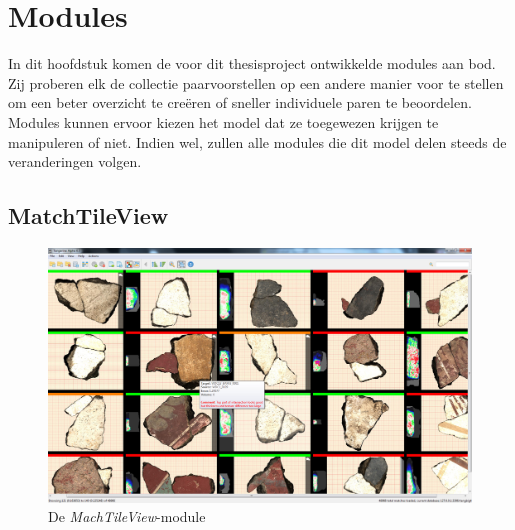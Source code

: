 \chapter{Modules}
\label{hoofdstuk:modules}
In dit hoofdstuk komen de voor dit thesisproject ontwikkelde modules aan bod. Zij proberen elk de collectie paarvoorstellen op een andere manier voor te stellen om een beter overzicht te cre\"eren of sneller individuele paren te beoordelen.\\

Modules kunnen ervoor kiezen het model dat ze toegewezen krijgen te manipuleren of niet. Indien wel, zullen alle modules die dit model delen steeds de veranderingen volgen.

\section{MatchTileView}

\begin{figure}[!h]
	\begin{center}
		\includegraphics[width=1.0\columnwidth]{images/matchtileview-nice-01.png}
		\caption{De \emph{MachTileView}-module}
		\label{fig:mtv1}
	\end{center}
\end{figure}

